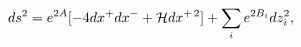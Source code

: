 \begin{equation}
\label{generalmetric}
ds^2=e^{2A}[-4dx^+dx^-+{\cal H}dx^{+\,2}]+\sum_ie^{2B_i}dz_i^2,
\label{eq:glcmet}
\end{equation}

